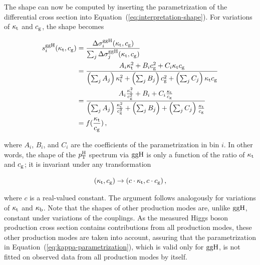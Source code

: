 The shape can now be computed by inserting the parametrization of the differential cross section into Equation~(\ref{eq:interpretation-shape}).
% 
For variations of $\kappa_{\mathrm{t}}$ and $c_\mathrm{g}$, the shape becomes
% 
\begin{linenomath*}
\begin{equation}
\label{eq:interpretation-shape-ktcg}
\begin{split}
s^{\mathrm{g}\mathrm{g}\mathrm{H}}_i(\kappa_{\mathrm{t}}, c_\mathrm{g})
        &=
        \frac
            {\Delta\sigma^{\mathrm{g}\mathrm{g}\mathrm{H}}_i(\kappa_{\mathrm{t}}, c_\mathrm{g})}
            {\sum_j \Delta\sigma^{\mathrm{g}\mathrm{g}\mathrm{H}}_j(\kappa_{\mathrm{t}}, c_\mathrm{g})}
            \\
        &=
        \frac
            {A_i \kappa_{\mathrm{t}}^2 + B_i c_\mathrm{g}^2 + C_i \kappa_{\mathrm{t}} c_\mathrm{g}}
            {
                \left(\sum_j A_j\right) \kappa_{\mathrm{t}}^2
                + \left(\sum_j B_j\right) c_\mathrm{g}^2
                + \left(\sum_j C_j\right) \kappa_{\mathrm{t}}c_\mathrm{g}
                }
            \\
        &= 
        \frac
            {A_i \frac{\kappa_{\mathrm{t}}^2}{c_\mathrm{g}^2} + B_i + C_i \frac{\kappa_{\mathrm{t}}}{c_\mathrm{g}}}
            {
                \left(\sum_j A_j\right) \frac{\kappa_{\mathrm{t}}^2}{c_\mathrm{g}^2}
                + \left(\sum_j B_j\right) 
                + \left(\sum_j C_j\right) \frac{\kappa_{\mathrm{t}}}{c_\mathrm{g}}
                }
            \\
        & = f(\frac{\kappa_{\mathrm{t}}}{c_\mathrm{g}})
\,,
\end{split}
\end{equation}
\end{linenomath*}
% 
where $A_i$, $B_i$, and $C_i$ are the coefficients of the parametrization in bin $i$.
% 
In other words, the shape of the $p_\mathrm{T}^\mathrm{H}$ spectrum via $\mathrm{g}\mathrm{g}\mathrm{H}$ is only a function of the ratio of $\kappa_{\mathrm{t}}$ and $c_\mathrm{g}$; it is invariant under any transformation
% 
\begin{linenomath*}
\begin{equation}
\label{eq:interpretation-ktcg-transform}
(\kappa_{\mathrm{t}}, c_\mathrm{g}) \to (c \cdot \kappa_{\mathrm{t}}, c \cdot c_\mathrm{g})
\,,
\end{equation}
\end{linenomath*}
% 
where $c$ is a real-valued constant.
% 
The argument follows analogously for variations of $\kappa_{\mathrm{t}}$ and $\kappa_{\mathrm{b}}$.
% 
Note that the shapes of other production modes are, unlike $\mathrm{g}\mathrm{g}\mathrm{H}$, constant under variations of the couplings.
% 
As the measured Higgs boson production cross section contains contributions from all production modes, these other production modes are taken into account, assuring that the parametrization in Equation~(\ref{eq:kappa-parametrization}), which is valid only for $\mathrm{g}\mathrm{g}\mathrm{H}$, is not fitted on observed data from all production modes by itself.


